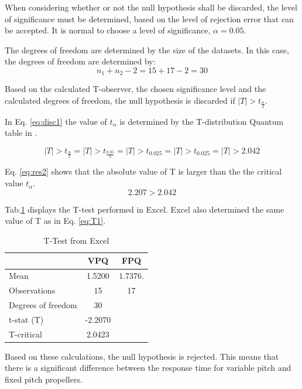 When considering whether or not the null hypothesis shall be discarded, the level of significance must be determined, based on the level of rejection error that can be accepted. It is normal to choose a level of significance, $\alpha= 0.05$. \bigskip

The degrees of freedom are determined by the size of the datasets. In this case, the degrees of freedom are determined by: 
\begin{equation}
\label{eq:dofd}
n_1+n_2-2 = 15 + 17 - 2 = 30
\end{equation}

Based on the calculated T-observer, the chosen significance level and the calculated degrees of freedom, the null hypothesis is discarded if $|T|>t_{\frac{\alpha}{2}}$. \bigskip

In Eq. \ref{eq:disc1} the value of $t_{\alpha}$ is determined by the T-distribution Quantum table in \cite{statistikk}. 

\begin{equation}
\label{eq:disc1}
|T|>t_{\frac{\alpha}{2}} = |T|>t_{\frac{0.05}{2}} = |T|>t_{0.025} = |T|>t_{0.025} = |T|>2.042
\end{equation}

Eq. \ref{eq:res2} shows that the absolute value of T is larger than the the critical value $t_{\alpha}$. 
\begin{equation}
\label{eq:res2}
   2.207>2.042
\end{equation}

Tab.\ref{tab:ttesft} displays the T-test performed in Excel. Excel also determined the same value of T as in Eq. \ref{eq:T1}.  

\begin{table}[H]
\caption{T-Test from Excel}
\label{tab:ttesft}
\centering
\begin{tabular}{| l | c | c |} 
  \hline
  & VPQ & FPQ\\
 \hline
 Mean & 1.5200 & 1.7376. \\
 Observations & 15 & 17 \\
 \hline
 Degrees of freedom & 30 &  \\
 t-stat (T) & -2.2070 & \\
 T-critical & 2.0423 & \\
 \hline
\end{tabular}
\end{table}\bigskip

Based on these calculations, the null hypothesis is rejected. This means that there is a significant difference between the response time for variable pitch and fixed pitch propellers. 
\newpage


